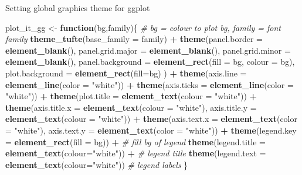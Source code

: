 \documentclass[10,portrait]{article}
\newenvironment{Shaded}{\begin{snugshade}}{\end{snugshade}}
\newcommand{\KeywordTok}[1]{\textcolor[rgb]{0.13,0.29,0.53}{\textbf{#1}}}
\newcommand{\DataTypeTok}[1]{\textcolor[rgb]{0.13,0.29,0.53}{#1}}
\newcommand{\StringTok}[1]{\textcolor[rgb]{0.31,0.60,0.02}{#1}}
\newcommand{\CommentTok}[1]{\textcolor[rgb]{0.56,0.35,0.01}{\textit{#1}}}
\newcommand{\ControlFlowTok}[1]{\textcolor[rgb]{0.13,0.29,0.53}{\textbf{#1}}}
\newcommand{\OperatorTok}[1]{\textcolor[rgb]{0.81,0.36,0.00}{\textbf{#1}}}
\newcommand{\NormalTok}[1]{#1}
\begin{document}
Setting global graphics theme for ggplot

\begin{Shaded}
\begin{Highlighting}[]
\NormalTok{plot_it_gg <-}\StringTok{ }\ControlFlowTok{function}\NormalTok{(bg,family)\{ }\CommentTok{# bg = colour to plot bg, family = font family}
  \KeywordTok{theme_tufte}\NormalTok{(}\DataTypeTok{base_family =}\NormalTok{ family) }\OperatorTok{+}
\StringTok{  }\KeywordTok{theme}\NormalTok{(}\DataTypeTok{panel.border =} \KeywordTok{element_blank}\NormalTok{(),}
        \DataTypeTok{panel.grid.major =} \KeywordTok{element_blank}\NormalTok{(),}
        \DataTypeTok{panel.grid.minor =} \KeywordTok{element_blank}\NormalTok{(),}
        \DataTypeTok{panel.background =} \KeywordTok{element_rect}\NormalTok{(}\DataTypeTok{fill =}\NormalTok{ bg,}
                                        \DataTypeTok{colour =}\NormalTok{ bg),}
        \DataTypeTok{plot.background =} \KeywordTok{element_rect}\NormalTok{(}\DataTypeTok{fill=}\NormalTok{bg)}
\NormalTok{  ) }\OperatorTok{+}
\StringTok{    }\KeywordTok{theme}\NormalTok{(}\DataTypeTok{axis.line =} \KeywordTok{element_line}\NormalTok{(}\DataTypeTok{color =} \StringTok{"white"}\NormalTok{)) }\OperatorTok{+}
\StringTok{    }\KeywordTok{theme}\NormalTok{(}\DataTypeTok{axis.ticks =} \KeywordTok{element_line}\NormalTok{(}\DataTypeTok{color =} \StringTok{"white"}\NormalTok{)) }\OperatorTok{+}
\StringTok{    }\KeywordTok{theme}\NormalTok{(}\DataTypeTok{plot.title =} \KeywordTok{element_text}\NormalTok{(}\DataTypeTok{colour =} \StringTok{"white"}\NormalTok{)) }\OperatorTok{+}
\StringTok{    }\KeywordTok{theme}\NormalTok{(}\DataTypeTok{axis.title.x =} \KeywordTok{element_text}\NormalTok{(}\DataTypeTok{colour =} \StringTok{"white"}\NormalTok{), }
          \DataTypeTok{axis.title.y =} \KeywordTok{element_text}\NormalTok{(}\DataTypeTok{colour =} \StringTok{"white"}\NormalTok{)) }\OperatorTok{+}
\StringTok{    }\KeywordTok{theme}\NormalTok{(}\DataTypeTok{axis.text.x =} \KeywordTok{element_text}\NormalTok{(}\DataTypeTok{color =} \StringTok{"white"}\NormalTok{),}
          \DataTypeTok{axis.text.y =} \KeywordTok{element_text}\NormalTok{(}\DataTypeTok{color =} \StringTok{"white"}\NormalTok{)) }\OperatorTok{+}
\StringTok{    }\KeywordTok{theme}\NormalTok{(}\DataTypeTok{legend.key =} \KeywordTok{element_rect}\NormalTok{(}\DataTypeTok{fill =}\NormalTok{ bg)) }\OperatorTok{+}\StringTok{ }\CommentTok{# fill bg of legend}
\StringTok{    }\KeywordTok{theme}\NormalTok{(}\DataTypeTok{legend.title =} \KeywordTok{element_text}\NormalTok{(}\DataTypeTok{colour=}\StringTok{"white"}\NormalTok{)) }\OperatorTok{+}\StringTok{ }\CommentTok{# legend title}
\StringTok{    }\KeywordTok{theme}\NormalTok{(}\DataTypeTok{legend.text =} \KeywordTok{element_text}\NormalTok{(}\DataTypeTok{colour=}\StringTok{"white"}\NormalTok{)) }\CommentTok{# legend labels}
\NormalTok{\} }
\end{Highlighting}
\end{Shaded}
\end{document}
